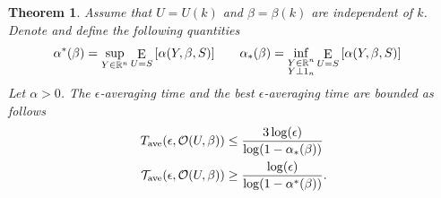 \documentclass{amsart}
\DeclareMathOperator{\E}{E}
\newcommand{\R}[0]{\mathbb{R}}
\newtheorem{theorem}{Theorem}
\theoremstyle{remark}
\begin{document}
\begin{theorem}{\label{theorem:epsilonAverageTime}}
	Assume that $U=U(k)$ and $\beta = \beta(k)$ are independent of $k$. Denote and define the following quantities
\begin{align}{\label{theorem:eq:alphaDefn}}
	\alpha^*(\beta) = \sup_{Y\in\R^n}\E_{U=S}\left[\alpha(Y,\beta,S)\right] \quad & \quad \alpha_*(\beta) = \inf_{\substack{Y\in\R^n\\Y\perp1_n}}\E_{U=S}\left[\alpha(Y,\beta,S)\right]
\end{align}
Let $\alpha>0$. The $\epsilon$-averaging time and the best $\epsilon$-averaging time are bounded as follows
\begin{align}{\label{theorem:eq:epsilonBounds}}
	T_{\text{ave}}(\epsilon,\mathcal{O}(U,\beta))&\leq \frac{3\log(\epsilon)}{\log(1-\alpha_*(\beta))}\\
	\mathcal{T}_{\text{ave}}(\epsilon,\mathcal{O}(U,\beta))&\geq \frac{\log(\epsilon)}{\log(1-\alpha^*(\beta))}.
\end{align}
\end{theorem}
\end{document}
